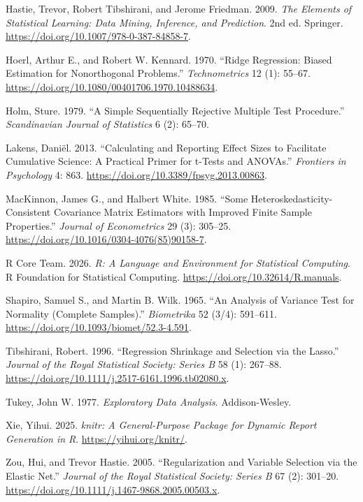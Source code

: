 \documentclass[
  10pt,
]{article}
\newlength{\cslhangindent}
\newenvironment{CSLReferences}[2] %
 {\begin{list}{}{%
  \setlength{\itemindent}{0pt}
  \setlength{\leftmargin}{0pt}
  \setlength{\parsep}{0pt}
  \ifodd #1
   \setlength{\leftmargin}{\cslhangindent}
   \setlength{\itemindent}{-1\cslhangindent}
  \fi
  \setlength{\itemsep}{#2\baselineskip}}}
 {\end{list}}
\begin{document}
\begin{CSLReferences}{1}{1}
Hastie, Trevor, Robert Tibshirani, and Jerome Friedman. 2009. \emph{The
Elements of Statistical Learning: Data Mining, Inference, and
Prediction}. 2nd ed. Springer.
\url{https://doi.org/10.1007/978-0-387-84858-7}.

Hoerl, Arthur E., and Robert W. Kennard. 1970. {``Ridge Regression:
Biased Estimation for Nonorthogonal Problems.''} \emph{Technometrics} 12
(1): 55--67. \url{https://doi.org/10.1080/00401706.1970.10488634}.

Holm, Sture. 1979. {``A Simple Sequentially Rejective Multiple Test
Procedure.''} \emph{Scandinavian Journal of Statistics} 6 (2): 65--70.

Lakens, Daniël. 2013. {``Calculating and Reporting Effect Sizes to
Facilitate Cumulative Science: A Practical Primer for t-Tests and
ANOVAs.''} \emph{Frontiers in Psychology} 4: 863.
\url{https://doi.org/10.3389/fpsyg.2013.00863}.

MacKinnon, James G., and Halbert White. 1985. {``Some
Heteroskedasticity-Consistent Covariance Matrix Estimators with Improved
Finite Sample Properties.''} \emph{Journal of Econometrics} 29 (3):
305--25. \url{https://doi.org/10.1016/0304-4076(85)90158-7}.

R Core Team. 2026. \emph{R: A Language and Environment for Statistical
Computing}. R Foundation for Statistical Computing.
\url{https://doi.org/10.32614/R.manuals}.

Shapiro, Samuel S., and Martin B. Wilk. 1965. {``An Analysis of Variance
Test for Normality (Complete Samples).''} \emph{Biometrika} 52 (3/4):
591--611. \url{https://doi.org/10.1093/biomet/52.3-4.591}.

Tibshirani, Robert. 1996. {``Regression Shrinkage and Selection via the
Lasso.''} \emph{Journal of the Royal Statistical Society: Series B} 58
(1): 267--88. \url{https://doi.org/10.1111/j.2517-6161.1996.tb02080.x}.

Tukey, John W. 1977. \emph{Exploratory Data Analysis}. Addison-Wesley.

Xie, Yihui. 2025. \emph{knitr: A General-Purpose Package for Dynamic
Report Generation in R}. \url{https://yihui.org/knitr/}.

Zou, Hui, and Trevor Hastie. 2005. {``Regularization and Variable
Selection via the Elastic Net.''} \emph{Journal of the Royal Statistical
Society: Series B} 67 (2): 301--20.
\url{https://doi.org/10.1111/j.1467-9868.2005.00503.x}.

\end{CSLReferences}
\end{document}
